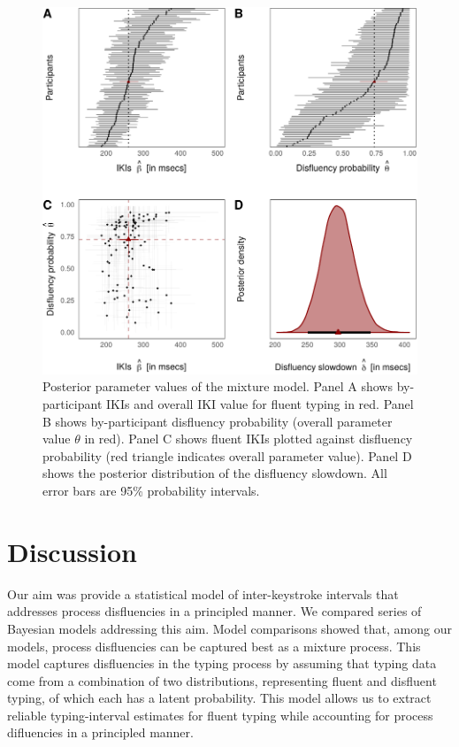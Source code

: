 \documentclass[english,jou,floatsintext]{apa7}
\begin{document}
\begin{figure}[!ht]

{\centering \includegraphics{frontline_files/figure-latex/parameters-1} 

}

\caption{Posterior parameter values of the mixture model. Panel A shows by-participant IKIs and overall IKI value for fluent typing in red. Panel B shows by-participant disfluency probability (overall parameter value $\theta$ in red). Panel C shows fluent IKIs plotted against disfluency probability (red triangle indicates overall parameter value). Panel D shows the posterior distribution of the disfluency slowdown. All error bars are 95\% probability intervals.}\label{fig:parameters}
\end{figure}

\hypertarget{discussion}{%
\section{Discussion}\label{discussion}}

Our aim was provide a statistical model of inter-keystroke intervals that addresses process disfluencies in a principled manner. We compared series of Bayesian models addressing this aim. Model comparisons showed that, among our models, process disfluencies can be captured best as a mixture process. This model captures disfluencies in the typing process by assuming that typing data come from a combination of two distributions, representing fluent and disfluent typing, of which each has a latent probability. This model allows us to extract reliable typing-interval estimates for fluent typing while accounting for process difluencies in a principled manner.
\end{document}
